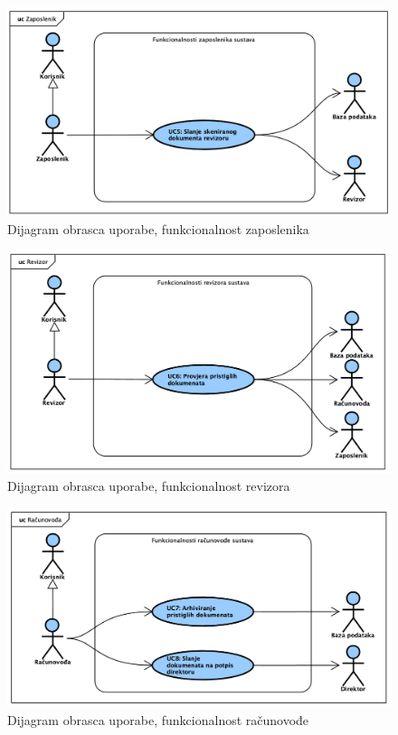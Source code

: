 					\begin{figure}[H]
						\includegraphics[width=\textwidth]{slike/UseCase_Zaposlenik.png}
						\caption{Dijagram obrasca uporabe, funkcionalnost zaposlenika}
						\label{fig:usecase_zaposlenik}
					\end{figure}

					\begin{figure}[H]
						\includegraphics[width=\textwidth]{slike/UseCase_Revizor.png}
						\caption{Dijagram obrasca uporabe, funkcionalnost revizora}
						\label{fig:usecase_revizor}
					\end{figure}

					\begin{figure}[H]
						\includegraphics[width=\textwidth]{slike/UseCase_Racunovoda.png}
						\caption{Dijagram obrasca uporabe, funkcionalnost računovođe}
						\label{fig:usecase_racunovoda}
					\end{figure}

